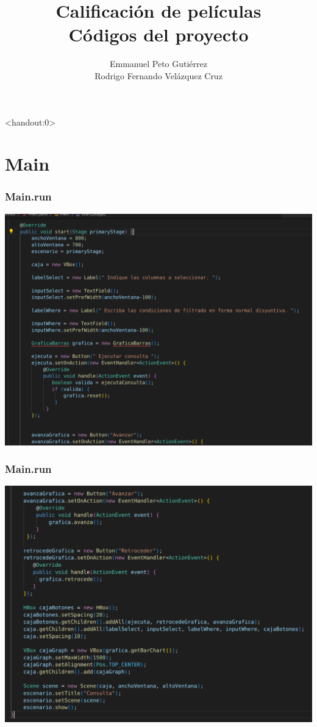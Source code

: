 \documentclass{beamer}
\title{Calificación de películas\\Códigos del proyecto}
\author{Emmanuel Peto Gutiérrez\\Rodrigo Fernando Velázquez Cruz}
\institute{IIMAS \\ UNAM}
\begin{document}
\begin{frame}<handout:0>
\titlepage
\end{frame}

\section{Main}

\begin{frame}
\frametitle{Main.run}

\includegraphics[width=\linewidth]{main_start1}

\end{frame}

\begin{frame}
\frametitle{Main.run}

\includegraphics[width=\linewidth]{main_start2}

\end{frame}
\end{document}
